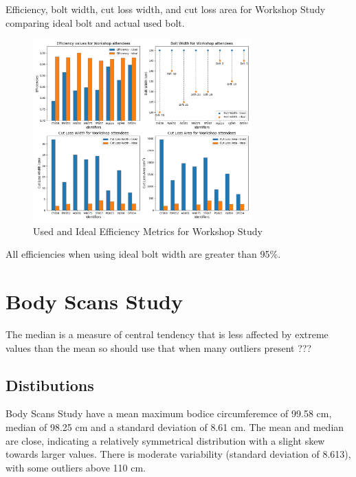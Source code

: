 Efficiency, bolt width, cut loss width, and cut loss area for Workshop Study comparing ideal bolt and actual used bolt.
\begin{figure} [htb] %
    \centering %
    \includegraphics[width = 0.75\textwidth]{Images/Workshop_Plot.png} %
    \caption{Used and Ideal Efficiency Metrics for Workshop Study}
\end{figure}
All efficiencies when using ideal bolt width are greater than 95\%.







\section{Body Scans Study}

The median is a measure of central tendency that is less affected by extreme values than the mean so should use that when many outliers present ???

\subsection{Distibutions}
Body Scans Study have a mean maximum bodice circumferemce of 99.58 cm, median of 98.25 cm and a standard deviation of 8.61 cm. The mean and median are close, indicating a relatively symmetrical distribution with a slight skew towards larger values. There is moderate variability (standard deviation of 8.613), with some outliers above 110 cm.

